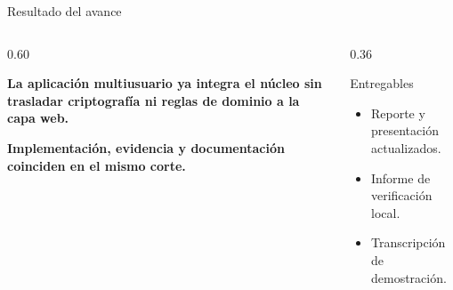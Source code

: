 \documentclass[aspectratio=169,11pt]{beamer}
\begin{document}
\begin{frame}{Resultado del avance}
  \begin{columns}[c,onlytextwidth]
    \begin{column}{0.60\textwidth}
      {\fontsize{18}{21}\selectfont\bfseries\color{tinta}
        La aplicación multiusuario ya integra el núcleo sin trasladar criptografía ni reglas de dominio a la capa web.\par}
      \vspace{0.2cm}
      {\normalsize\color{verde}\bfseries Implementación, evidencia y documentación coinciden en el mismo corte.}
    \end{column}
    \begin{column}{0.36\textwidth}
      \begin{block}{Entregables}
        \footnotesize
        \begin{itemize}
          \item Reporte y presentación actualizados.
          \item Informe de verificación local.
          \item Transcripción de demostración.
        \end{itemize}
      \end{block}
    \end{column}
  \end{columns}
  \vspace{0.2cm}
\end{frame}
\end{document}
